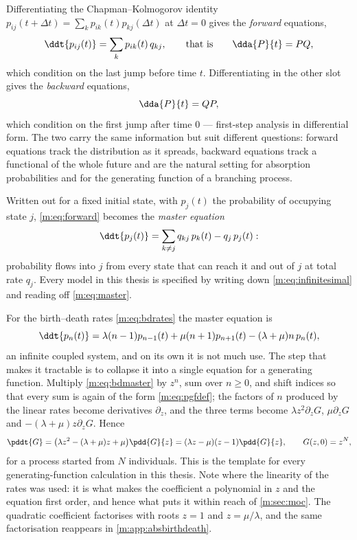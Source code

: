 Differentiating the Chapman--Kolmogorov identity
$p_{ij}(t+\Delta t)=\sum_kp_{ik}(t)p_{kj}(\Delta t)$ at $\Delta t=0$ gives the
\emph{forward} equations,
\begin{equation}
\label{m:eq:forward}
\ddt{p_{ij}(t)} = \sum_kp_{ik}(t)\,q_{kj},
\qquad\text{that is}\qquad
\dda{P}{t} = PQ ,
\end{equation}
which condition on the last jump before time $t$. Differentiating in the other slot
gives the \emph{backward} equations,
\begin{equation}
\label{m:eq:backwardeq}
\dda{P}{t} = QP ,
\end{equation}
which condition on the first jump after time $0$ --- first-step analysis in
differential form. The two carry the same information but suit different questions:
forward equations track the distribution as it spreads, backward equations track a
functional of the whole future and are the natural setting for absorption
probabilities and for the generating function of a branching process.

Written out for a fixed initial state, with $p_j(t)$ the probability of occupying
state $j$, \cref{m:eq:forward} becomes the \emph{master equation}
\begin{equation}
\label{m:eq:master}
\ddt{p_j(t)} = \sum_{k\neq j}q_{kj}\,p_k(t) - q_j\,p_j(t) :
\end{equation}
probability flows into $j$ from every state that can reach it and out of $j$ at
total rate $q_j$. Every model in this thesis is specified by writing down
\cref{m:eq:infinitesimal} and reading off \cref{m:eq:master}.

For the birth--death rates \cref{m:eq:bdrates} the master equation is
\begin{equation}
\label{m:eq:bdmaster}
\ddt{p_n(t)} = \lambda(n-1)p_{n-1}(t) + \mu(n+1)p_{n+1}(t) - (\lambda+\mu)n\,p_n(t),
\end{equation}
an infinite coupled system, and on its own it is not much use. The step that makes
it tractable is to collapse it into a single equation for a generating function.
Multiply \cref{m:eq:bdmaster} by $z^n$, sum over $n\ge0$, and shift indices so that
every sum is again of the form \cref{m:eq:pgfdef}; the factors of $n$ produced by
the linear rates become derivatives $\partial_z$, and the three terms become
$\lambda z^2\partial_zG$, $\mu\partial_zG$ and $-(\lambda+\mu)z\partial_zG$. Hence
\begin{equation}
\label{m:eq:bdpde}
\pddt{G} = \bigl(\lambda z^2-(\lambda+\mu)z+\mu\bigr)\pdd{G}{z}
= (\lambda z-\mu)(z-1)\pdd{G}{z},
\qquad
G(z,0)=z^N ,
\end{equation}
for a process started from $N$ individuals. This is the template for every
generating-function calculation in this thesis. Note where the linearity of the
rates was used: it is what makes the coefficient a polynomial in $z$ and the
equation first order, and hence what puts it within reach of
\cref{m:sec:moc}. The quadratic coefficient factorises with roots $z=1$ and
$z=\mu/\lambda$, and the same factorisation reappears in
\cref{m:app:absbirthdeath}.

